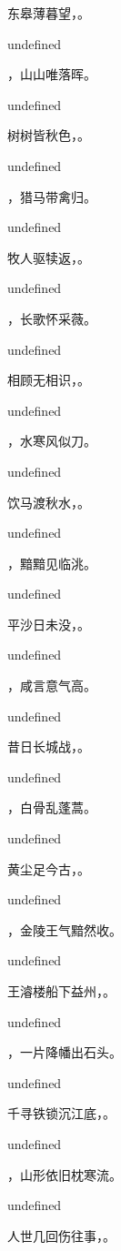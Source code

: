 \documentclass[12pt, a4paper, addpoints]{exam}
\begin{document}
\begin{questions}
\question[3] 东皋薄暮望，\fillin。

undefined

\question[3] \fillin，山山唯落晖。

undefined

\question[3] 树树皆秋色，\fillin。

undefined

\question[3] \fillin，猎马带禽归。

undefined

\question[3] 牧人驱犊返，\fillin。

undefined

\question[3] \fillin，长歌怀采薇。

undefined

\question[3] 相顾无相识，\fillin。

undefined

\question[3] \fillin，水寒风似刀。

undefined

\question[3] 饮马渡秋水，\fillin。

undefined

\question[3] \fillin，黯黯见临洮。

undefined

\question[3] 平沙日未没，\fillin。

undefined

\question[3] \fillin，咸言意气高。

undefined

\question[3] 昔日长城战，\fillin。

undefined

\question[3] \fillin，白骨乱蓬蒿。

undefined

\question[3] 黄尘足今古，\fillin。

undefined

\question[3] \fillin，金陵王气黯然收。

undefined

\question[3] 王濬楼船下益州，\fillin。

undefined

\question[3] \fillin，一片降幡出石头。

undefined

\question[3] 千寻铁锁沉江底，\fillin。

undefined

\question[3] \fillin，山形依旧枕寒流。

undefined

\question[3] 人世几回伤往事，\fillin。


\end{questions}
\end{document}
